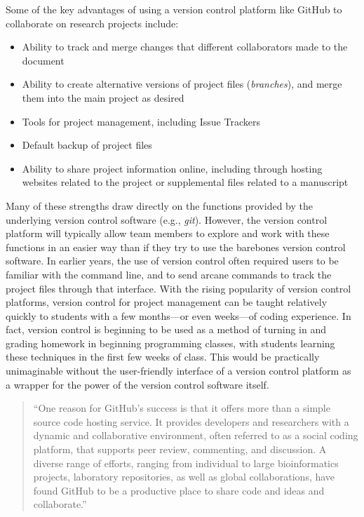 \documentclass[]{tufte-book}
\providecommand{\tightlist}{%
  \setlength{\itemsep}{0pt}\setlength{\parskip}{0pt}}
\begin{document}
Some of the key advantages of using a version control platform like GitHub
to collaborate on research projects include:

\begin{itemize}
\tightlist
\item
  Ability to track and merge changes that different collaborators made to the
  document
\item
  Ability to create alternative versions of project files (\emph{branches}), and merge them into the main project as desired
\item
  Tools for project management, including Issue Trackers
\item
  Default backup of project files
\item
  Ability to share project information online, including through hosting websites related to the project or supplemental files related to a manuscript
\end{itemize}

Many of these strengths draw directly on the functions provided by the
underlying version control software (e.g., \emph{git}). However, the version control
platform will typically allow team members to explore and work with these
functions in an easier way than if they try to use the barebones version control
software. In earlier years, the use of version control often required users to
be familiar with the command line, and to send arcane commands to track the
project files through that interface. With the rising popularity of version
control platforms, version control for project management can be taught
relatively quickly to students with a few months---or even weeks---of coding
experience. In fact, version control is beginning to be used as a method of
turning in and grading homework in beginning programming classes, with students
learning these techniques in the first few weeks of class. This would be
practically unimaginable without the user-friendly interface of a version
control platform as a wrapper for the power of the version control software
itself.

\begin{quote}
``One reason for GitHub's success is that it offers more than a simple source
code hosting service. It provides developers and researchers with a dynamic and
collaborative environment, often referred to as a social coding platform, that
supports peer review, commenting, and discussion. A diverse range of efforts,
ranging from individual to large bioinformatics projects, laboratory
repositories, as well as global collaborations, have found GitHub to be a
productive place to share code and ideas and collaborate.'' \citep{perez2016ten}
\end{quote}
\end{document}
